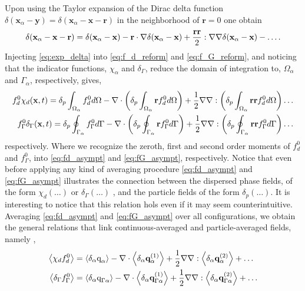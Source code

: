 {Upon using the Taylor expansion of the Dirac delta function $\delta(\textbf{x}_\alpha - \textbf{y}) = \delta(\textbf{x}_\alpha - \textbf{x}- \textbf{r})$ in the neighborhood of $\textbf{r}=0$ one obtain
\begin{equation}
\delta(\textbf{x}_\alpha - \textbf{x}-\textbf{r}) 
= \delta(\textbf{x}_\alpha - \textbf{x}) 
- \textbf{r}\cdot\grad \delta(\textbf{x}_\alpha - \textbf{x}) 
+ \frac{\textbf{rr}}{2}:\grad\grad\delta(\textbf{x}_\alpha- \textbf{x}) - \ldots.
\label{eq:exp_delta}
\end{equation}
Injecting \ref{eq:exp_delta} into \ref{eq:f_d_reform} and \ref{eq:f_G_reform}, and noticing that the indicator functions, $\chi_\alpha$ and $\delta_\Gamma$, reduce the domain of integration to, $\Omega_\alpha$ and $\Gamma_\alpha$, respectively,  gives, 
\begin{align}
    f^0_d \chi_d(\textbf{x},t)
    =\delta_p\intO{f^0_d}
    - \div\left(\delta_p\intO{\textbf{r} f^0_d}\right)
    + \frac{1}{2}\grad\grad :\left(\delta_p\intO{\textbf{rr} f^0_d}\right)
    \ldots 
    \label{eq:fd_asympt}
   \\
   f_\Gamma^0 \delta_\Gamma (\textbf{x},t)
   =\delta_p\intS{f^0_\Gamma}
   - \div\left(\delta_p\intS{\textbf{r} f^0_\Gamma}\right)
   + \frac{1}{2}\grad\grad :\left(\delta_p\intS{\textbf{rr} f^0_\Gamma}\right)
   \ldots 
   \label{eq:fG_asympt}
\end{align}
respectively. 
Where we recognize the zeroth, first and second order moments of $f_d^0$ and $f_\Gamma^0$, into \ref{eq:fd_asympt} and \ref{eq:fG_asympt}, respectively. 
Notice that even before applying any kind of averaging procedure \ref{eq:fd_asympt} and \ref{eq:fG_asympt} illustrates the connection between the dispersed phase fields, of the form $\chi_d(\ldots)$ or $\delta_\Gamma(\ldots)$ , and the particle fields of the form $\delta_p(\ldots)$. 
It is interesting to notice that this relation hols even if it may seem counterintuitive. 
}
Averaging \ref{eq:fd_asympt} and \ref{eq:fG_asympt} over all configurations, we obtain the general relations that link continuous-averaged and particle-averaged fields, namely \citep{lhuillier1992ensemble,lhuillier1998,lhuillier2000bilan}, 
\begin{align}
    \avg{\chi_df_d^0} 
    &=  \pavg{\text q_\alpha}
        - \div  
        \pavg{\textbf{q}_\alpha^{(1)}}        
        + \frac{1}{2} \grad\grad : \pavg{\textbf{q}_{\alpha}^{(2)}}
        + \ldots  \label{eq:f_exp_chi} \\
    \avg{\delta_\Gamma  f_\Gamma ^0} 
    &=  \pavg{\text q_{\Gamma \alpha}}        
        - \div \pavg{\textbf{q}_{\Gamma\alpha}^{(1)}}
        + \frac{1}{2} \grad\grad : \pavg{\textbf{q}_{\Gamma\alpha}^{(2)}}
        + \ldots  
    \label{eq:f_exp_delta}
\end{align}
